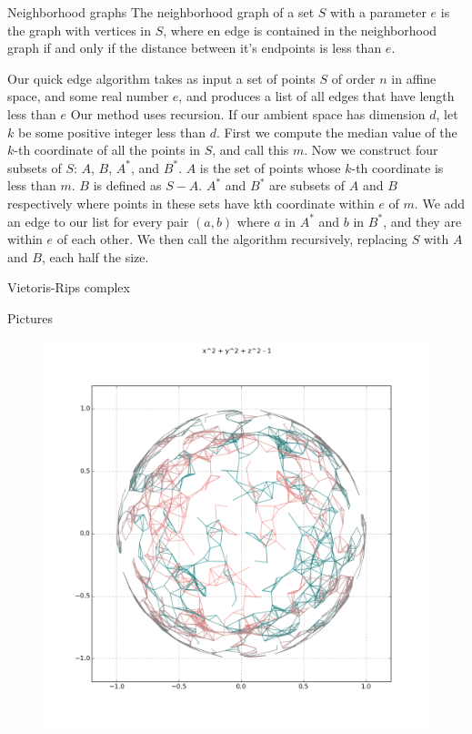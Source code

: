 \documentclass{beamer}
\begin{document}
\begin{frame}{}
\begin{columns}[t]
\begin{column}{0.32\linewidth}
\begin{block}{Neighborhood graphs}
The neighborhood graph of a set $S$ with a parameter $e$ is the graph with vertices in $S$, 
where en edge is contained in the neighborhood graph if and only if the distance between it's endpoints is less than $e$.

Our quick edge algorithm takes as input a set of points $S$ of order $n$ in affine space, and some real number $e$, and produces a list of all edges that have length less than $e$ 
Our method uses recursion. If our ambient space has dimension $d$, let $k$ be some positive integer less than $d$. 
First we compute the median value of the $k$-th coordinate of all the points in $S$, and call this $m$. 
Now we construct four subsets of $S$: $A$, $B$, $A^*$, and $B^*$. 
$A$ is the set of points whose $k$-th coordinate is less than $m$. 
$B$ is defined as $S-A$. 
$A^*$ and $B^*$ are subsets of $A$ and $B$ respectively where points in these sets have kth coordinate within $e$ of $m$. 
We add an edge to our list for every pair $(a,b)$ where $a$ in $A^*$ and $b$ in $B^*$, and they are within $e$ of each other. 
We then call the algorithm recursively, replacing $S$ with $A$ and $B$, each half the size.
\end{block}

\begin{block}{Vietoris-Rips complex}

\end{block}

\begin{block}{Pictures}
\begin{figure}[htb]
\centering
\includegraphics[width=1\columnwidth]{plot2d_ng_61}
\end{figure}
\end{block}


\end{column}
\end{columns}
\end{frame}
\end{document}

